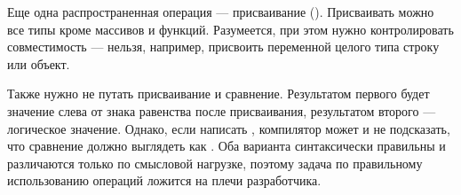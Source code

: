 \documentclass[book.tex]{subfiles}
\begin{document}

Еще одна распространенная операция --- присваивание (\cppword{=}). Присваивать можно все типы кроме массивов и функций. Разумеется, при этом нужно контролировать совместимость --- нельзя, например, присвоить переменной целого типа строку или объект.


Также нужно не путать присваивание и сравнение. Результатом первого будет значение слева от знака равенства после присваивания, результатом второго --- логическое значение. Однако, если написать , компилятор может и не подсказать, что сравнение должно выглядеть как . Оба варианта синтаксически правильны и различаются только по смысловой нагрузке, поэтому задача по правильному использованию операций ложится на плечи разработчика.
\end{document}
